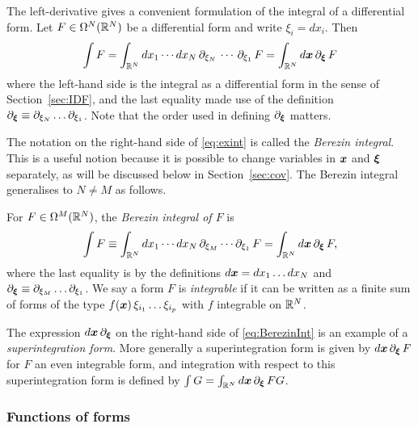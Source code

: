 \documentclass[11pt,a4paper]{article}
\begin{document}
\begin{example}
  The left-derivative gives a convenient formulation of the integral
  of a differential form. Let $F \in \Omega^N(\mathbb{R}^N)$ be a differential
  form and write $\xi_i = dx_i$. Then
  \begin{equation}
    \label{eq:exint}
    \int F = \int_{\mathbb{R}^N} dx_1 \cdots dx_N \, \partial_{\xi_N} \, \cdots\, \partial_{\xi_1} \, F
    = \int_{\mathbb{R}^N} d\boldsymbol{x} \, \partial_{\boldsymbol{\xi}} \, F
  \end{equation}
  where the left-hand side is the integral as a differential form in
  the sense of Section~\ref{sec:IDF}, and the last equality made use
  of the definition
  $\partial_{\boldsymbol{\xi}} \equiv \partial_{\xi_{N}}\dots \partial_{\xi_{1}}$.
  Note that the order used in defining $\partial_{\boldsymbol{\xi}}$ matters.
\end{example}

The notation on the right-hand side of \eqref{eq:exint} is called the
\emph{Berezin integral}.  This is a useful notion
because it is possible to change variables in $\boldsymbol{x}$ and $\boldsymbol{\xi}$
separately, as will be discussed below in Section~\ref{sec:cov}.  The
Berezin integral generalises to $N \neq M$ as follows.
\begin{definition}
  \label{def:BerezinInt}
  For $F\in\Omega^{M}(\mathbb{R}^{N})$, the \emph{Berezin integral of $F$} is
  \begin{equation}
    \label{eq:BerezinInt}
    \int F \equiv \int_{\mathbb{R}^{N}}dx_{1}\cdots dx_{N}
    \, \partial_{\xi_{M}}\cdots\partial_{\xi_{1}} \, F
    = \int_{\mathbb{R}^{N}} d\boldsymbol{x} \, \partial_{\boldsymbol{\xi}} \, F,
  \end{equation}
  where the last equality is by the definitions
  $d\boldsymbol{x} = dx_{1}\dots dx_{N}$ and
  $\partial_{\boldsymbol{\xi}} \equiv \partial_{\xi_{M}}\dots \partial_{\xi_{1}}$.  We say a
  form $F$ is \emph{integrable} if it can be written as a finite sum of forms
  of the type $f(\boldsymbol{x}) \, \xi_{i_1}\dots\xi_{i_p}$ with $f$
  integrable on $\mathbb{R}^N$.
\end{definition}

The expression $d\boldsymbol{x}\, \partial_{\boldsymbol{\xi}}$ on the right-hand side
of \eqref{eq:BerezinInt} is an example of a \emph{superintegration form}.
More generally a superintegration form is given by
$d\boldsymbol{x} \, \partial_{\boldsymbol{\xi}}\, F$ for $F$ an even integrable form, and
integration with respect to this superintegration form is defined by
$\int G = \int_{\mathbb{R}^{N}} d\boldsymbol{x}\,\partial_{\boldsymbol{\xi}} \, FG$.

\subsubsection{Functions of forms}
\label{sec:functions-forms}
\end{document}
